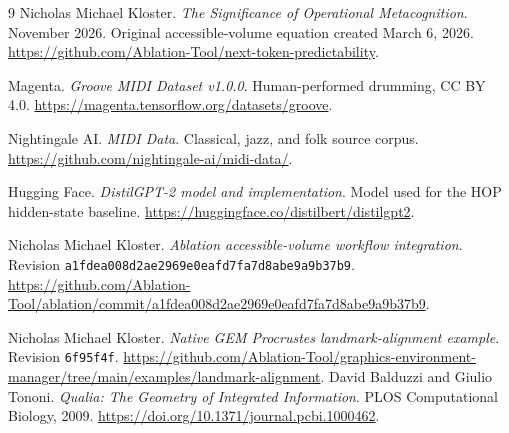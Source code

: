 \documentclass[11pt,a4paper]{article}
\begin{document}
\clearpage
\begin{thebibliography}{9}
Nicholas Michael Kloster.
\newblock \emph{The Significance of Operational Metacognition}.
\newblock November 2026. Original accessible-volume equation created March 6, 2026.
\newblock \url{https://github.com/Ablation-Tool/next-token-predictability}.

Magenta.
\newblock \emph{Groove MIDI Dataset v1.0.0}.
\newblock Human-performed drumming, CC BY 4.0.
\newblock \url{https://magenta.tensorflow.org/datasets/groove}.

Nightingale AI.
\newblock \emph{MIDI Data}.
\newblock Classical, jazz, and folk source corpus.
\newblock \url{https://github.com/nightingale-ai/midi-data/}.

Hugging Face.
\newblock \emph{DistilGPT-2 model and implementation}.
\newblock Model used for the HOP hidden-state baseline.
\newblock \url{https://huggingface.co/distilbert/distilgpt2}.

Nicholas Michael Kloster.
\newblock \emph{Ablation accessible-volume workflow integration}.
\newblock Revision \texttt{a1fdea008d2ae2969e0eafd7fa7d8abe9a9b37b9}.
\newblock \url{https://github.com/Ablation-Tool/ablation/commit/a1fdea008d2ae2969e0eafd7fa7d8abe9a9b37b9}.

Nicholas Michael Kloster.
\newblock \emph{Native GEM Procrustes landmark-alignment example}.
\newblock Revision \texttt{6f95f4f}.
\newblock \url{https://github.com/Ablation-Tool/graphics-environment-manager/tree/main/examples/landmark-alignment}.
David Balduzzi and Giulio Tononi.
\newblock \emph{Qualia: The Geometry of Integrated Information}.
\newblock PLOS Computational Biology, 2009.
\newblock \url{https://doi.org/10.1371/journal.pcbi.1000462}.
\end{thebibliography}
\end{document}
